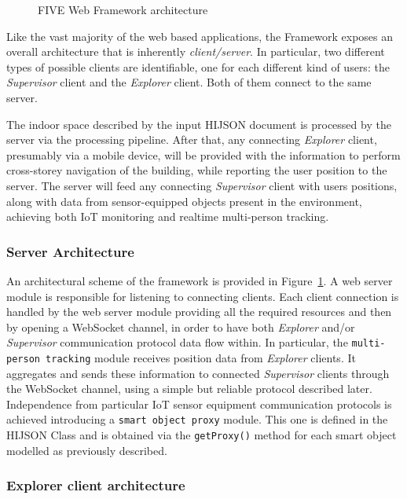 \begin{figure}[htb]
\centering
{}
\caption{FIVE Web Framework architecture}
\label{fig:architecture}
\end{figure}

Like the vast majority of the web based applications, the Framework exposes an
overall architecture that is inherently \emph{client/server}. In particular,
two different types of possible clients are identifiable, one for each different 
kind of users: the \emph{Supervisor} client and the \emph{Explorer} client. 
Both of them connect to the same server.

The indoor space described by the input HIJSON document is
processed by the server via the processing pipeline. After that, any connecting
\emph{Explorer} client, presumably via a mobile device, will be provided
with the information to perform cross-storey navigation of the building, while
reporting the user position to the server. The server will feed any connecting
\emph{Supervisor} client with users positions, along with data from sensor-equipped 
objects present in the environment, achieving both IoT monitoring and 
realtime multi-person tracking.

\subsubsection{Server Architecture}\label{server-architecture}

An architectural scheme of the framework is provided in Figure~\ref{fig:architecture}. A web server module is responsible for listening to
connecting clients. Each client connection is handled by the web server module
providing all the required resources and then by opening a WebSocket channel, in order to
have both \emph{Explorer} and/or \emph{Supervisor} communication
protocol data flow within. In particular, the \texttt{multi-person\ tracking} module receives
position data from \emph{Explorer} clients. It aggregates and sends these
information to connected \emph{Supervisor} clients through the WebSocket
channel, using a simple but reliable protocol described later. Independence
from particular IoT sensor equipment communication protocols is achieved
introducing a \texttt{smart\ object\ proxy} module. This one is defined in the HIJSON Class
and is obtained via the {\tt getProxy()} method for each smart
object modelled as previously described.

\subsubsection{Explorer client architecture}\label{explorer-client-architecture}

